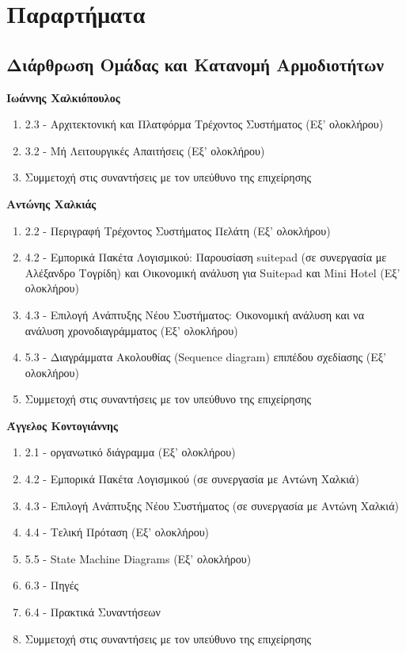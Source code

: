 \chapter{Παραρτήματα}
		
\section{Διάρθρωση Ομάδας και Κατανομή Αρμοδιοτήτων}

\noindent
\textbf{Ιωάννης Χαλκιόπουλος}
\begin{enumerate}
	\item 2.3 - Αρχιτεκτονική και Πλατφόρμα Τρέχοντος Συστήματος  (Εξ’ ολοκλήρου)
	\item 3.2 - Μή Λειτουργικές Απαιτήσεις  (Εξ’ ολοκλήρου)
	\item Συμμετοχή στις συναντήσεις με τον υπεύθυνο της επιχείρησης
\end{enumerate}

\noindent
\textbf{Αντώνης Χαλκιάς}
\begin{enumerate}
\item 2.2 - Περιγραφή Τρέχοντος Συστήματος Πελάτη (Εξ’ ολοκλήρου)
\item 4.2 - Εμπορικά Πακέτα Λογισμικού: Παρουσίαση suitepad (σε συνεργασία με Αλέξανδρο Τογρίδη) και Οικονομική ανάλυση για Suitepad και 
			Mini Hotel (Εξ’ ολοκλήρου)
\item 4.3 - Επιλογή Ανάπτυξης Νέου Συστήματος: Οικονομική ανάλυση και να ανάλυση χρονοδιαγράμματος (Εξ’ ολοκλήρου)
\item 5.3 - Διαγράμματα Ακολουθίας (Sequence diagram) επιπέδου σχεδίασης (Εξ’ ολοκλήρου)
\item Συμμετοχή στις συναντήσεις με τον υπεύθυνο της επιχείρησης
\end{enumerate}

\noindent
\textbf{Άγγελος Κοντογιάννης}
\begin{enumerate}
	\item 2.1 - οργανωτικό διάγραμμα (Εξ’ ολοκλήρου)
	\item 4.2 - Εμπορικά Πακέτα Λογισμικού (σε συνεργασία με Αντώνη Χαλκιά)
	\item 4.3 - Επιλογή Ανάπτυξης Νέου Συστήματος (σε συνεργασία με Αντώνη Χαλκιά)
	\item 4.4 - Τελική Πρόταση (Εξ’ ολοκλήρου)
	\item 5.5 - State Machine Diagrams (Εξ’ ολοκλήρου)
	\item 6.3 - Πηγές
	\item 6.4 - Πρακτικά Συναντήσεων
	\item Συμμετοχή στις συναντήσεις με τον υπεύθυνο της επιχείρησης
\end{enumerate}

